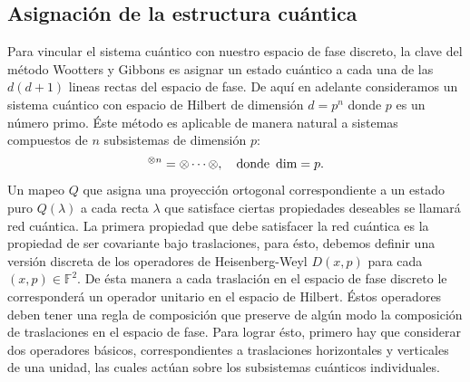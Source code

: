 \documentclass[a4paper]{report}
\let\H\relax
\DeclareMathOperator{\H}{\mathcal H}
\begin{document}
  \subsection{Asignación de la estructura cuántica}

  Para vincular el sistema cuántico con nuestro espacio de
  fase discreto, la clave del método Wootters y Gibbons es
  asignar un estado cuántico a cada una de las $d(d+1)$
  lineas rectas del espacio de fase. De aquí en adelante
  consideramos un sistema cuántico con espacio de Hilbert de
  dimensión $d = p^{n}$ donde $p$ es un número primo. Éste
  método es aplicable de manera natural a sistemas
  compuestos de $n$ subsistemas de dimensión $p$:
  \begin{equation}
    \H^{\otimes n}
    = \H \otimes \cdots \otimes \H,
    \quad
    \text{donde } \dim\H = p.
  \end{equation}
  Un mapeo $Q$ que asigna
  una proyección ortogonal correspondiente a un estado puro
  $Q(\lambda)$ a cada recta $\lambda$ que satisface ciertas
  propiedades deseables se llamará red
  cuántica. La primera propiedad que debe satisfacer la red
  cuántica es la propiedad de ser covariante bajo
  traslaciones, para ésto, debemos definir una versión
  discreta de los operadores de Heisenberg-Weyl $ D(x,p)$
  para cada $(x,p) \in \mathbb F^2$. De ésta
  manera a cada traslación en el espacio de fase discreto le
  corresponderá un operador unitario en el espacio de
  Hilbert. Éstos operadores deben tener una regla de
  composición que preserve de algún modo la composición de
  traslaciones en el espacio de fase. Para lograr ésto,
  primero hay que considerar dos operadores básicos,
  correspondientes a traslaciones horizontales y verticales
  de una unidad, las cuales actúan sobre los subsistemas
  cuánticos individuales.
\end{document}

